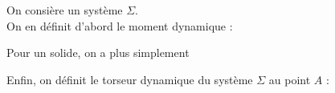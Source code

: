 ﻿\documentclass[a4paper]{article}
\begin{document}
\pagestyle{fancy}
\fancyhf{}
\setlength{\headheight}{15pt}

\begin{center}
	\large{}
\end{center}


On consière un système \( \Sigma \). \\
On en définit d'abord le moment dynamique :
\begin{center}
\end{center}

Pour un solide, on a plus simplement
\begin{center}
\end{center}

Enfin, on définit le torseur dynamique du système \( \Sigma \) au point $A$ :
\begin{center}
\end{center}
\end{document}

